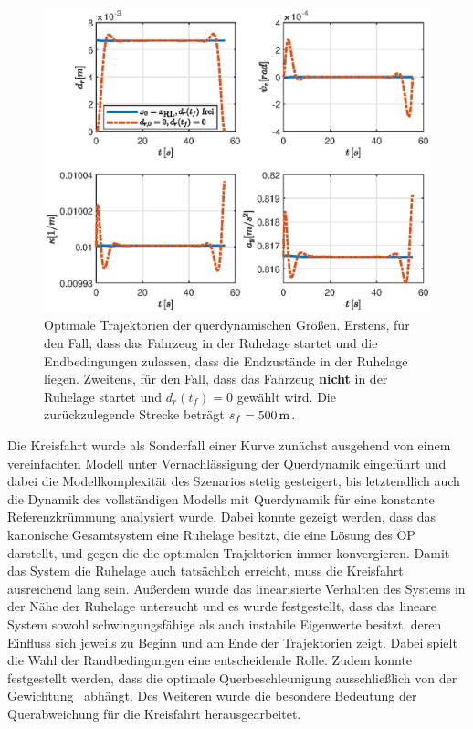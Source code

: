 \begin{figure}[h] 
	\centering
	\includegraphics[width=\linewidth]{./Bilder/Ergebnisse/Kreisfahrt/Mit_Querdynamik/Querdyn_RL_ay.eps}
	\caption{Optimale Trajektorien der querdynamischen Größen. Erstens, für den Fall, dass das Fahrzeug in der Ruhelage startet und die Endbedingungen zulassen, dass die Endzustände in der Ruhelage liegen. Zweitens, für den Fall, dass das Fahrzeug \textbf{nicht} in der Ruhelage startet und $d_r(t_f) = 0$ gewählt wird. Die zurückzulegende Strecke beträgt $s_f = 500\,\mathrm{m}$.}
	\label{fig:Querdyn_RL_ay}
\end{figure} 

Die Kreisfahrt wurde als Sonderfall einer Kurve zunächst ausgehend von einem vereinfachten Modell unter Vernachlässigung der Querdynamik eingeführt und dabei die Modellkomplexität des Szenarios stetig gesteigert, bis letztendlich auch die Dynamik des vollständigen Modells mit Querdynamik für eine konstante Referenzkrümmung analysiert wurde. Dabei konnte gezeigt werden, dass das kanonische Gesamtsystem eine Ruhelage besitzt, die eine Lösung des \gls{OP} darstellt, und gegen die die optimalen Trajektorien immer konvergieren. Damit das System die Ruhelage auch tatsächlich erreicht, muss die Kreisfahrt ausreichend lang sein. Außerdem wurde das linearisierte Verhalten des Systems in der Nähe der Ruhelage untersucht und es wurde festgestellt, dass das lineare System sowohl schwingungsfähige als auch instabile Eigenwerte besitzt, deren Einfluss sich jeweils zu Beginn und am Ende der Trajektorien zeigt. Dabei spielt die Wahl der Randbedingungen eine entscheidende Rolle. Zudem konnte festgestellt werden, dass die optimale Querbeschleunigung ausschließlich von der Gewichtung \fay~abhängt. Des Weiteren wurde die besondere Bedeutung der Querabweichung für die Kreisfahrt herausgearbeitet. 

